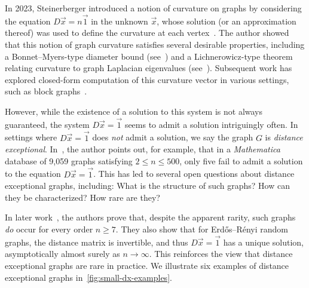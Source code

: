 \documentclass[11pt,a4paper]{article}
\newcommand{\distmatrix}{D}
\newcommand{\x}{\vec{x}}
\newcommand{\one}{\vec{1}}
\begin{document}
    In 2023, Steinerberger introduced a notion of curvature on graphs by considering the equation $\distmatrix\x  = n\one$ in the unknown $\x $, whose solution (or an approximation thereof) was used to define the curvature at each vertex~\cite{steinerberger2023curvature}. The author showed that this notion of graph curvature satisfies several desirable properties, including a Bonnet--Myers-type diameter bound (see~\cite[Thm. 1]{steinerberger2023curvature}) and a Lichnerowicz-type theorem relating curvature to graph Laplacian eigenvalues (see~\cite[Thm. 2]{steinerberger2023curvature}). Subsequent work has explored closed-form computation of this curvature vector in various settings, such as block graphs~\cite{cushing2024note}. 
    
    However, while the existence of a solution to this system is not always guaranteed, the system $\distmatrix\x = \one$ seems to admit a solution intriguingly often. In settings where $\distmatrix\x  = \one$ does \emph{not} admit a solution, we say the graph $G$ is \emph{distance exceptional}. In~\cite{steinerberger2023curvature}, the author points out, for example, that in a \emph{Mathematica} database of 9,059 graphs satisfying $2\leq n\leq 500$, only five fail to admit a solution to the equation $\distmatrix\x  = \one$. This has led to several open questions about distance exceptional graphs, including: What is the structure of such graphs? How can they be characterized? How rare are they? 

    In later work~\cite{dudarov2023image}, the authors prove that, despite the apparent rarity, such graphs \emph{do} occur for every order $n\ge 7$. They also show that for Erd\H{o}s--R\'enyi random graphs, the distance matrix is invertible, and thus $\distmatrix\x =\one$ has a unique solution, asymptotically almost surely as $n\rightarrow\infty$. This reinforces the view that distance exceptional graphs are rare in practice. We illustrate six examples of distance exceptional graphs in~\cref{fig:small-dx-examples}.
\end{document}
